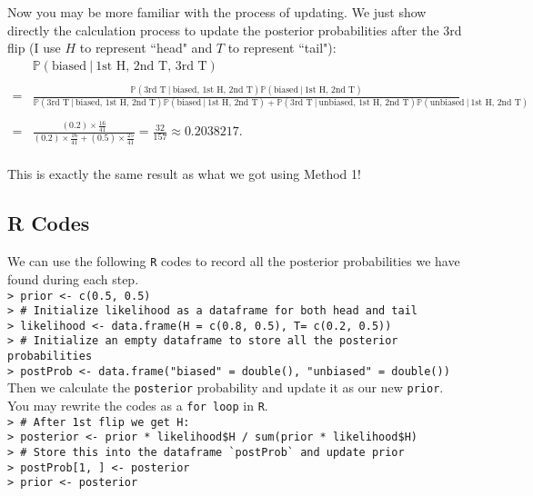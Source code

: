 \documentclass{article}
\def\dsst{\displaystyle}
\begin{document}
Now you may be more familiar with the process of updating. We just show directly the calculation process to update the posterior probabilities after the 3rd flip (I use $H$ to represent ``head" and $T$ to represent ``tail"):
\begin{align*}
& \mathbb{P}(\text{biased}~|~\text{1st H, 2nd T, 3rd T}) \\
& \\
= & \frac{\mathbb{P}(\text{3rd T}~|~\text{biased, 1st H, 2nd T})\mathbb{P}(\text{biased}~|~\text{1st H, 2nd T})}{\mathbb{P}(\text{3rd T}~|~\text{biased, 1st H, 2nd T})\mathbb{P}(\text{biased}~|~\text{1st H, 2nd T}) + \mathbb{P}(\text{3rd T}~|~\text{unbiased, 1st H, 2nd T})\mathbb{P}(\text{unbiased}~|~\text{1st H, 2nd T})} \\
& \\
= & \frac{\dsst (0.2)\times \frac{16}{41}}{\dsst (0.2)\times \frac{16}{41} + (0.5)\times \frac{25}{41}} = \frac{32}{157} \approx 0.2038217.\\
\end{align*}

This is exactly the same result as what we got using Method 1! 

\subsection*{R Codes}

We can use the following \verb|R| codes to record all the posterior probabilities we have found during each step.\\

\noindent \verb|> prior <- c(0.5, 0.5)|\\
\verb|> # Initialize likelihood as a dataframe for both head and tail|\\
\verb|> likelihood <- data.frame(H = c(0.8, 0.5), T= c(0.2, 0.5))|\\
\verb|> # Initialize an empty dataframe to store all the posterior probabilities|\\
\verb|> postProb <- data.frame("biased" = double(), "unbiased" = double())|\\

Then we calculate the \verb|posterior| probability and update it as our new \verb|prior|. You may rewrite the codes as a \verb|for loop| in \verb|R|.\\

\noindent \verb|> # After 1st flip we get H:|\\
\verb|> posterior <- prior * likelihood$H / sum(prior * likelihood$H)|\\
\verb|> # Store this into the dataframe `postProb` and update prior|\\
\verb|> postProb[1, ] <- posterior|\\
\verb|> prior <- posterior|\\
\end{document}
